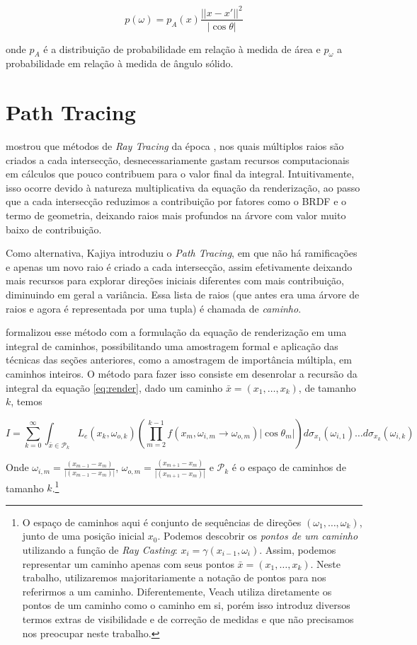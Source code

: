 \[
  p(\omega) = p_A(x) \frac{||x - x'||^2}{|\cos \theta|} 
\]

onde $p_A$ é a distribuição de probabilidade em relação à medida de área e
$p_\omega$ a probabilidade em relação à medida de ângulo sólido.

\section{Path Tracing}

\citet{kajiya86} mostrou que métodos de \emph{Ray Tracing} da época
\citep{cook84, whitted80}, nos quais múltiplos raios são criados a cada
intersecção, desnecessariamente gastam recursos computacionais em cálculos que
pouco contribuem para o valor final da integral. Intuitivamente, isso ocorre
devido à natureza multiplicativa da equação da renderização, ao passo que a cada
intersecção reduzimos a contribuição por fatores como o BRDF e o termo de
geometria, deixando raios mais profundos na árvore com valor muito baixo de
contribuição.

Como alternativa, Kajiya introduziu o \emph{Path Tracing}, em que não há
ramificações e apenas um novo raio é criado a cada intersecção, assim
efetivamente deixando mais recursos para explorar direções iniciais diferentes
com mais contribuição, diminuindo em geral a variância. Essa lista de raios (que
antes era uma árvore de raios e agora é representada por uma tupla) é chamada de
\emph{caminho}.

\citet{veach97} formalizou esse método com a formulação da equação de
renderização em uma integral de caminhos, possibilitando uma amostragem formal
e aplicação das técnicas das seções anteriores, como a amostragem de
importância múltipla, em caminhos inteiros. O método para fazer isso consiste
em desenrolar a recursão da integral da equação \ref{eq:render}, dado um
caminho $\bar{x} = (x_1, \ldots, x_k)$, de tamanho $k$, temos

\begin{equation}
  I =  \sum_{k=0}^\infty \int_{\bar{x} \in \mathcal{P}_k} L_e(x_k,
  \omega_{o,k}) \left(\prod_{m=2}^{k-1} f(x_m, \omega_{i,m} \rightarrow
  \omega_{o,m})|\cos\theta_m|\right)
  d\sigma_{x_1}(\omega_{i,1}) \ldots d\sigma_{x_k}(\omega_{i,k})
\end{equation}

Onde $\omega_{i,m} = \frac{(x_{m-1} - x_{m})}{|(x_{m-1} - x_{m})|}$,
$\omega_{o,m} = \frac{(x_{m+1} - x_{m})}{|(x_{m+1} - x_{m})|}$ e $\mathcal{P}_k$
é o espaço de caminhos de tamanho $k$.\footnote{O espaço de caminhos aqui é
conjunto de sequências de direções $(\omega_1, \ldots, \omega_k)$, junto de uma
posição inicial $x_0$. Podemos descobrir os \emph{pontos de um caminho}
utilizando a função de \emph{Ray Casting}: $x_i = \gamma(x_{i-1}, \omega_i)$.
Assim, podemos representar um caminho apenas com seus pontos $\bar{x} = (x_1,
\ldots, x_k)$. Neste trabalho, utilizaremos majoritariamente a notação de pontos
para nos referirmos a um caminho. Diferentemente, Veach utiliza diretamente os
pontos de um caminho como o caminho em si, porém isso introduz diversos termos
extras de visibilidade e de correção de medidas e que não precisamos nos
preocupar neste trabalho.}

